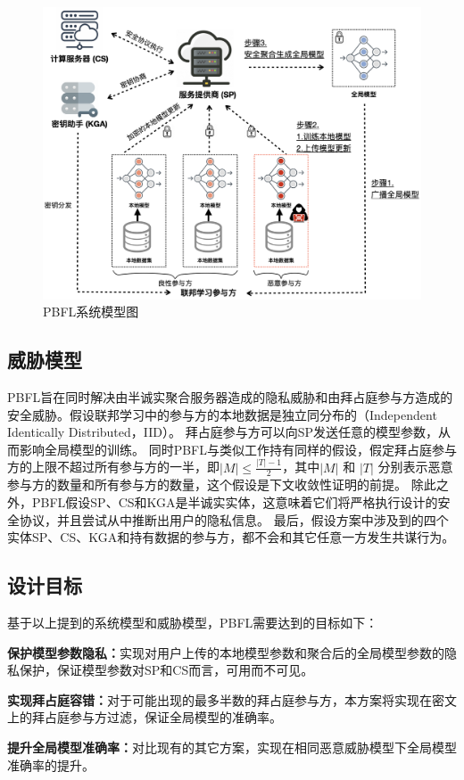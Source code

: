 \begin{figure}[htbp]
	\begin{center}
		\includegraphics[width=0.8\linewidth]{figures/keynote-figs/PBFL.png}
		\caption{PBFL系统模型图}
		\label{syspnd}
	\end{center}
\end{figure}

\subsection{威胁模型}
PBFL旨在同时解决由半诚实聚合服务器造成的隐私威胁和由拜占庭参与方造成的安全威胁。假设联邦学习中的参与方的本地数据是独立同分布的（Independent Identically Distributed，IID）。
拜占庭参与方可以向SP发送任意的模型参数，从而影响全局模型的训练。
同时PBFL与类似工作\cite{so2020byzantine, yin2018byzantine, liu2021privacy}持有同样的假设，假定拜占庭参与方的上限不超过所有参与方的一半，即$|M|\leq\frac{|T|-1}{2}$，其中$|M|$ 和 $|T|$ 分别表示恶意参与方的数量和所有参与方的数量，这个假设是下文收敛性证明的前提。
除此之外，PBFL假设SP、CS和KGA是半诚实实体，这意味着它们将严格执行设计的安全协议，并且尝试从中推断出用户的隐私信息。
最后，假设方案中涉及到的四个实体SP、CS、KGA和持有数据的参与方，都不会和其它任意一方发生共谋行为。

\subsection{设计目标}
基于以上提到的系统模型和威胁模型，PBFL需要达到的目标如下：
\begin{compactitem}
	\item \textbf{保护模型参数隐私：}实现对用户上传的本地模型参数和聚合后的全局模型参数的隐私保护，保证模型参数对SP和CS而言，可用而不可见。
	\item \textbf{实现拜占庭容错：}对于可能出现的最多半数的拜占庭参与方，本方案将实现在密文上的拜占庭参与方过滤，保证全局模型的准确率。
	\item \textbf{提升全局模型准确率：}对比现有的其它方案，实现在相同恶意威胁模型下全局模型准确率的提升。
\end{compactitem}

